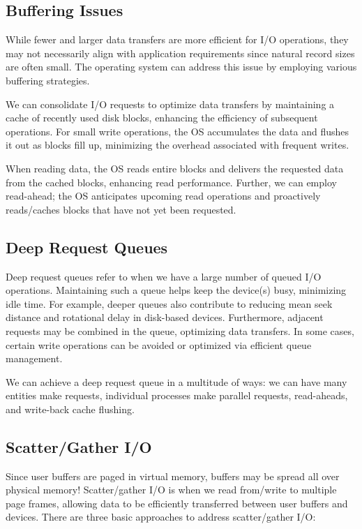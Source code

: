 \documentclass{report}
\begin{document}
\subsection{Buffering Issues}
While fewer and larger data transfers are more efficient for I/O operations, they may not
necessarily align with application requirements since natural record sizes are often small. The
operating system can address this issue by employing various buffering strategies.

We can consolidate I/O requests to optimize data transfers by maintaining a cache of recently used
disk blocks, enhancing the efficiency of subsequent operations. For small write operations, the OS
accumulates the data and flushes it out as blocks fill up, minimizing the overhead associated with
frequent writes.

When reading data, the OS reads entire blocks and delivers the requested data from the cached
blocks, enhancing read performance. Further, we can employ read-ahead; the OS anticipates upcoming
read operations and proactively reads/caches blocks that have not yet been requested.


\subsection{Deep Request Queues}
Deep request queues refer to when we have a large number of queued I/O operations. Maintaining such
a queue helps keep the device(s) busy, minimizing idle time. For example, deeper queues also contribute to
reducing mean seek distance and rotational delay in disk-based devices. Furthermore, adjacent requests may be
combined in the queue, optimizing data transfers. In some cases, certain write operations can be
avoided or optimized via efficient queue management.

We can achieve a deep request queue in a multitude of ways: we can have many entities make requests,
individual processes make parallel requests, read-aheads, and write-back cache flushing.


\subsection{Scatter/Gather I/O}
Since user buffers are paged in virtual memory, buffers may be spread all over physical memory!
Scatter/gather I/O is when we read from/write to multiple page frames, allowing data to be
efficiently transferred between user buffers and devices. There are three basic approaches to
address scatter/gather I/O:
\end{document}
